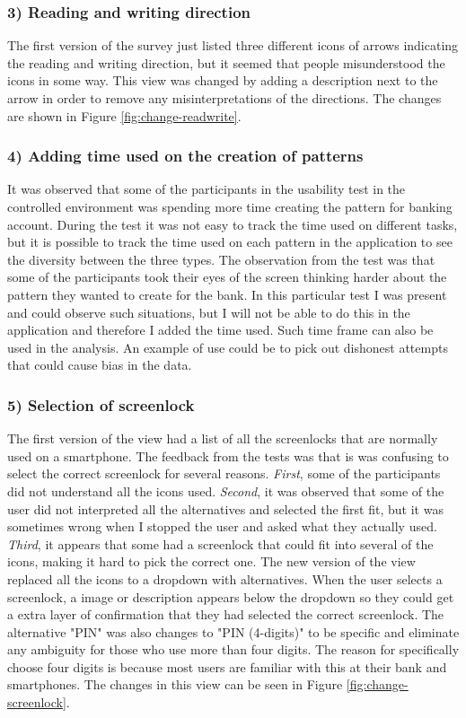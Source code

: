     \subsubsection*{3) Reading and writing direction}
    The first version of the survey just listed three different icons of arrows indicating the reading and writing direction, but it seemed that people misunderstood the icons in some way. This view was changed by adding a description next to the arrow in order to remove any misinterpretations of the directions. The changes are shown in Figure \ref{fig:change-readwrite}.

    \subsubsection*{4) Adding time used on the creation of patterns}
    It was observed that some of the participants in the usability test in the controlled environment was spending more time creating the pattern for banking account. During the test it was not easy to track the time used on different tasks, but it is possible to track the time used on each pattern in the application to see the diversity between the three types. The observation from the test was that some of the participants took their eyes of the screen thinking harder about the pattern they wanted to create for the bank. In this particular test I was present and could observe such situations, but I will not be able to do this in the application and therefore I added the time used. Such time frame can also be used in the analysis. An example of use could be to pick out dishonest attempts that could cause bias in the data. 
      
    \subsubsection*{5) Selection of screenlock}
    The first version of the view had a list of all the screenlocks that are normally used on a smartphone. The feedback from the tests was that is was confusing to select the correct screenlock for several reasons. {\it First}, some of the participants did not understand all the icons used. {\it Second}, it was observed that some of the user did not interpreted all the alternatives and selected the first fit, but it was sometimes wrong when I stopped the user and asked what they actually used. {\it Third}, it appears that some had a screenlock that could fit into several of the icons, making it hard to pick the correct one. The new version of the view replaced all the icons to a dropdown with alternatives. When the user selects a screenlock, a image or description appears below the dropdown so they could get a extra layer of confirmation that they had selected the correct screenlock. The alternative "PIN" was also changes to "PIN (4-digits)" to be specific and eliminate any ambiguity for those who use more than four digits. The reason for specifically choose four digits is because most users are familiar with this at their bank and smartphones. The changes in this view can be seen in Figure \ref{fig:change-screenlock}.
    
